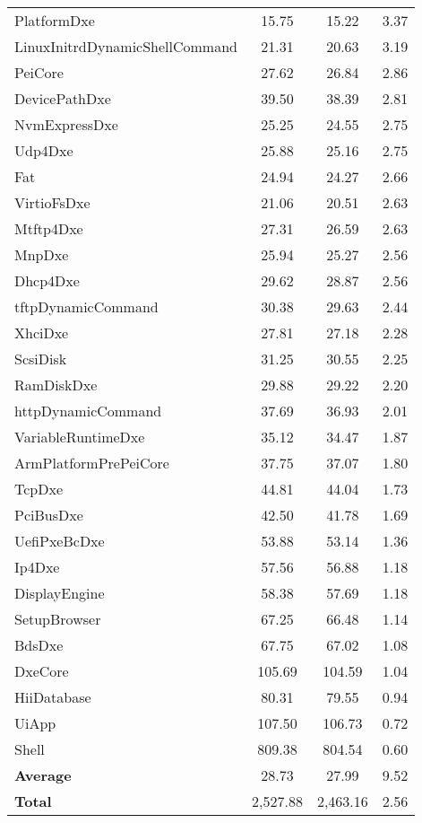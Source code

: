 \begin{longtable}{l c c c}
  PlatformDxe & 15.75 & 15.22 & 3.37\\
  LinuxInitrdDynamicShellCommand & 21.31 & 20.63 & 3.19\\
  PeiCore & 27.62 & 26.84 & 2.86\\
  DevicePathDxe & 39.50 & 38.39 & 2.81\\
  NvmExpressDxe & 25.25 & 24.55 & 2.75\\
  Udp4Dxe & 25.88 & 25.16 & 2.75\\
  Fat & 24.94 & 24.27 & 2.66\\
  VirtioFsDxe & 21.06 & 20.51 & 2.63\\
  Mtftp4Dxe & 27.31 & 26.59 & 2.63\\
  MnpDxe & 25.94 & 25.27 & 2.56\\
  Dhcp4Dxe & 29.62 & 28.87 & 2.56\\
  tftpDynamicCommand & 30.38 & 29.63 & 2.44\\
  XhciDxe & 27.81 & 27.18 & 2.28\\
  ScsiDisk & 31.25 & 30.55 & 2.25\\
  RamDiskDxe & 29.88 & 29.22 & 2.20\\
  httpDynamicCommand & 37.69 & 36.93 & 2.01\\
  VariableRuntimeDxe & 35.12 & 34.47 & 1.87\\
  ArmPlatformPrePeiCore & 37.75 & 37.07 & 1.80\\
  TcpDxe & 44.81 & 44.04 & 1.73\\
  PciBusDxe & 42.50 & 41.78 & 1.69\\
  UefiPxeBcDxe & 53.88 & 53.14 & 1.36\\
  Ip4Dxe & 57.56 & 56.88 & 1.18\\
  DisplayEngine & 58.38 & 57.69 & 1.18\\
  SetupBrowser & 67.25 & 66.48 & 1.14\\
  BdsDxe & 67.75 & 67.02 & 1.08\\
  DxeCore & 105.69 & 104.59 & 1.04\\
  HiiDatabase & 80.31 & 79.55 & 0.94\\
  UiApp & 107.50 & 106.73 & 0.72\\
  Shell & 809.38 & 804.54 & 0.60\\
  \midrule
  \textbf{Average} & 28.73 & 27.99 & 9.52\\
  \textbf{Total} & 2,527.88 & 2,463.16 & 2.56\\
  \bottomrule
\end{longtable}

